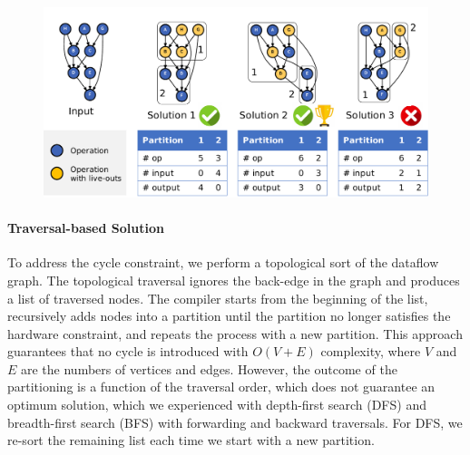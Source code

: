 \begin{figure}
  \centering
  \includegraphics[width=1\columnwidth]{figs/parteg.pdf}
  \caption[Compute partitioning example]{
    \todo{}
  }
  \label{fig:parteg}
\end{figure}

\paragraph{Traversal-based Solution}
To address the cycle constraint, we perform a topological sort of the dataflow graph.
The topological traversal ignores the back-edge in the graph and produces a list of traversed nodes. 
The compiler starts from the beginning of the list, recursively adds nodes into a partition until the partition no longer satisfies the hardware constraint, and repeats the process with a new partition.
This approach guarantees that no cycle is introduced with $O(V+E)$ complexity, where $V$ and $E$ are the numbers of vertices and edges.
However, the outcome of the partitioning is a function of the traversal order, which does not guarantee an optimum solution, which we experienced with depth-first search (DFS) and breadth-first search (BFS) with forwarding and backward traversals.
For DFS, we re-sort the remaining list each time we start with a new partition.


